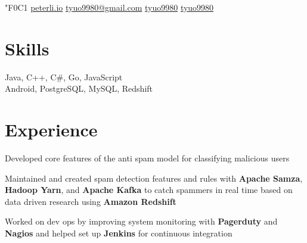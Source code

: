 \documentclass[]{peter_resume}
\begin{document}

{

   {\fa\char"F0C1} \href{http://peterli.io}{peterli.io}
     \href{mailto:tyuo9980@gmail.com}{tyuo9980@gmail.com}
     \href{https://github.com/tyuo9980}{tyuo9980}
     \href{https://www.linkedin.com/in/tyuo9980}{tyuo9980} 
}
\sectionsep
\vspace{0.3cm}

\begin{minipage}{\textwidth}


\section{Skills}
\enspace
{\hfill Java, C++, C\#, Go, JavaScript}
\vspace{0.1cm}
\\
\enspace
{\hfill Android, PostgreSQL, MySQL, Redshift}
\sectionsep


\section{Experience}
\vspace{\topsep} %
\begin{tightemize}
\item Developed core features of the anti spam model for classifying malicious users
\item Maintained and created spam detection features and rules with \textbf{Apache Samza}, \textbf{Hadoop Yarn}, and \textbf{Apache Kafka} to catch spammers in real time based on data driven research using \textbf{Amazon Redshift}
\item Worked on dev ops by improving system monitoring with \textbf{Pagerduty} and \textbf{Nagios} and helped set up \textbf{Jenkins} for continuous integration
\end{tightemize}
\sectionsep


\end{minipage}
\end{document}
